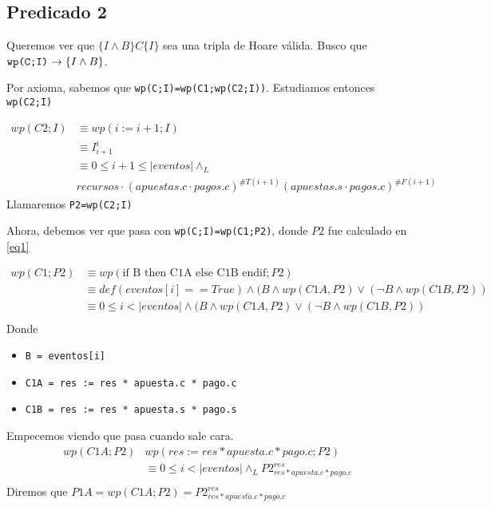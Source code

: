 \documentclass[../document.tex]{subfiles}
\begin{document}
\subsection*{Predicado 2}
Queremos ver que $\{I \land B\}C\{I\}$ sea una tripla de Hoare válida. Busco que $\verb+wp(C;I)+ \to \{I \land B\}$.

Por axioma, sabemos que \verb+wp(C;I)=wp(C1;wp(C2;I))+. Estudiamos entonces \verb|wp(C2;I)|

\begin{equation} \label{eq1}
\begin{split}
wp(C2;I) & \equiv wp(i := i+1;I) \\
         & \equiv I^{i}_{i+1} \\
         & \equiv 0\leq i+1 \leq |eventos| \land_L\\ 
         &recursos \cdot (apuestas.c\cdot pagos.c)^{\#T(i+1)}(apuestas.s\cdot pagos.c)^{\#F(i+1)}
\end{split}
\end{equation}
Llamaremos \verb|P2=wp(C2;I)|

Ahora, debemos ver que pasa con \verb+wp(C;I)=wp(C1;P2)+, donde $P2$ fue calculado en \ref{eq1}

\begin{equation} \label{eq2}
\begin{split}
wp(C1;P2) & \equiv wp(\text{if B then C1A else C1B endif};P2) \\
          & \equiv def(eventos[i]==True) \land (B \land wp(C1A, P2) \lor (\neg B \land wp(C1B, P2)) \\
          & \equiv 0\leq i < |eventos| \land (B \land wp(C1A, P2) \lor (\neg B \land wp(C1B, P2)) \\
\end{split}
\end{equation}
Donde
\begin{itemize}
    \item \verb|B = eventos[i]|
    \item \verb|C1A = res := res * apuesta.c * pago.c|
    \item \verb|C1B = res := res * apuesta.s * pago.s|
\end{itemize}

Empecemos viendo que pasa cuando sale cara.
\begin{equation} \label{eq2.a}
\begin{split}
wp(C1A;P2) & wp(res := res * apuesta.c * pago.c; P2) \\
           & \equiv 0\leq i<|eventos| \land_{L} P2^{res}_{res * apuesta.c * pago.c} \\
\end{split}
\end{equation}
Diremos que $P1A = wp(C1A;P2) = P2^{res}_{res * apuesta.c * pago.c}$
\end{document}
